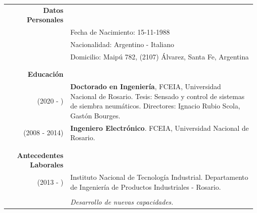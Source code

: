 \documentclass[a4paper,10pt, sans]{article}
\begin{document}
  \vspace{0.5cm}
  \large
  \begin{table}[h!]
  \begin{tabularx}{\textwidth}{r X}
    \textbf{Datos Personales} & {} \\ [1ex]
      {} & Fecha de Nacimiento: 15-11-1988 \\ [1ex]
      {} & Nacionalidad: Argentino - Italiano \\ [1ex]
      {} & Domicilio: Maipú 782, (2107) Álvarez, Santa Fe, Argentina \\ \\ \hline \\

    
    \textbf{Educación} & {} \\ [1ex]
       (2020 - ) & \textbf{Doctorado en Ingeniería}, FCEIA, Universidad Nacional de Rosario. Tesis: Sensado y control de sistemas de siembra neumáticos. Directores: Ignacio Rubio Scola, Gastón Bourges.\\ [1ex]
       (2008 - 2014) & \textbf{Ingeniero Electrónico}. FCEIA, Universidad Nacional de Rosario.\\ \\ \hline \\
    \textbf{Antecedentes Laborales} & {}\\ [1ex]
      (2013 - ) & Instituto Nacional de Tecnología Industrial. Departamento de Ingeniería de Productos Industriales - Rosario.\\ \\
            
        {} & \hspace{2cm} \textit{Desarrollo de nuevas capacidades.} \\ [1ex]
        

\end{tabularx}
\end{table}
\end{document}

